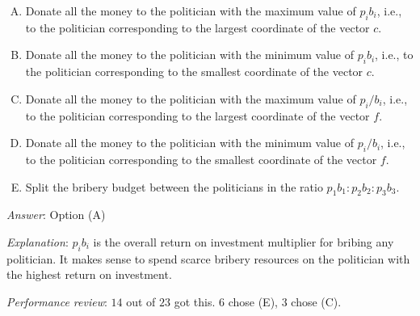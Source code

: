 \documentclass[10pt]{amsart}
\begin{document}
\begin{enumerate}
  \begin{enumerate}[(A)]
  \item Donate all the money to the politician with the maximum value
    of $p_ib_i$, i.e., to the politician corresponding to the largest
    coordinate of the vector $c$.
  \item Donate all the money to the politician with the minimum value
    of $p_ib_i$, i.e., to the politician corresponding to the smallest
    coordinate of the vector $c$.
  \item Donate all the money to the politician with the maximum value
    of $p_i/b_i$, i.e., to the politician corresponding to the largest
    coordinate of the vector $f$.
  \item Donate all the money to the politician with the minimum value
    of $p_i/b_i$, i.e., to the politician corresponding to the smallest
    coordinate of the vector $f$.
  \item Split the bribery budget between the politicians in the ratio
    $p_1b_1:p_2b_2:p_3b_3$.
  \end{enumerate}

  {\em Answer}: Option (A)

  {\em Explanation}: $p_ib_i$ is the overall return on investment
  multiplier for bribing any politician. It makes sense to spend
  scarce bribery resources on the politician with the highest return
  on investment.

  {\em Performance review}: $14$ out of $23$ got this. $6$ chose (E),
  $3$ chose (C).
\end{enumerate}
\end{document}
